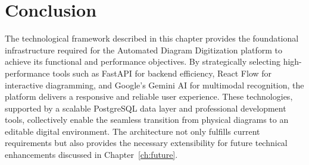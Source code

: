 \section{Conclusion}
\label{sec:tech-conclusion}

The technological framework described in this chapter provides 
the foundational infrastructure required for the Automated 
Diagram Digitization platform to achieve its functional and 
performance objectives. By strategically selecting 
high-performance tools such as FastAPI for backend efficiency, 
React Flow for interactive diagramming, and Google's Gemini AI 
for multimodal recognition, the platform delivers a responsive 
and reliable user experience. These technologies, supported by 
a scalable PostgreSQL data layer and professional development 
tools, collectively enable the seamless transition from 
physical diagrams to an editable digital environment. The 
architecture not only fulfills current requirements but also 
provides the necessary extensibility for future technical 
enhancements discussed in 
Chapter~\ref{ch:future}.